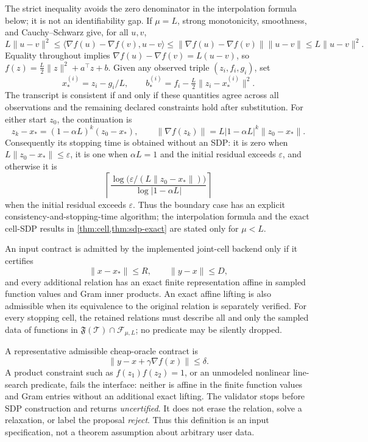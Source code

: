 \documentclass[smallextended]{svjour3}
\newcommand{\cF}{\mathcal{F}}
\newcommand{\cT}{\mathcal{T}}
\newcommand{\ip}[2]{\langle #1,#2\rangle}
\newcommand{\norm}[1]{\lVert #1\rVert}
\newcommand{\eps}{\varepsilon}
\begin{document}
\begin{remark}[$\mu=L$ boundary]
\label{rem:equal-curvature}
The strict inequality avoids the zero denominator in the interpolation formula
below; it is not an identifiability gap.  If $\mu=L$, strong monotonicity,
smoothness, and Cauchy--Schwarz give, for all $u,v$,
\[
 L\norm{u-v}^2
 \leq \ip{\nabla f(u)-\nabla f(v)}{u-v}
 \leq \norm{\nabla f(u)-\nabla f(v)}\norm{u-v}
 \leq L\norm{u-v}^2.
\]
Equality throughout implies $\nabla f(u)-\nabla f(v)=L(u-v)$, so
$f(z)=\tfrac L2\norm{z}^2+a^\top z+b$.  Given any observed triple
$(z_i,f_i,g_i)$, set
\[
 x_*^{(i)}=z_i-g_i/L,
 \qquad
 b_*^{(i)}=f_i-\tfrac L2\norm{z_i-x_*^{(i)}}^2.
\]
The transcript is consistent if and only if these quantities agree across all
observations and the remaining declared constraints hold after substitution.
For either start $z_0$, the continuation is
\[
 z_k-x_*=(1-\alpha L)^k(z_0-x_*),\qquad
 \norm{\nabla f(z_k)}=L|1-\alpha L|^k\norm{z_0-x_*}.
\]
Consequently its stopping time is obtained without an SDP: it is zero when
$L\norm{z_0-x_*}\leq\eps$, it is one when $\alpha L=1$ and the initial
residual exceeds $\eps$, and otherwise it is
\[
 \left\lceil
 \frac{\log\!\bigl(\eps/(L\norm{z_0-x_*})\bigr)}
      {\log|1-\alpha L|}
 \right\rceil
\]
when the initial residual exceeds $\eps$.  Thus the boundary case has an
explicit consistency-and-stopping-time algorithm; the interpolation formula and the exact
cell-SDP results in \cref{thm:cell,thm:sdp-exact} are stated only for
$\mu<L$.
\end{remark}

\begin{definition}
\label{def:transcript-interface}
An input contract is admitted by the implemented joint-cell backend only if
it certifies
\begin{equation}
 \norm{x-x_*}\leq R,\qquad \norm{y-x}\leq D,
 \label{eq:distance-bounds}
\end{equation}
and every additional relation has an exact finite representation affine in
sampled function values and Gram inner products.  An exact affine lifting is
also admissible when its equivalence to the original relation is separately
verified.  For every stopping cell, the retained relations must describe all
and only the sampled data of functions in
$\mathfrak F(\cT)\cap\cF_{\mu,L}$; no predicate may be silently dropped.
\end{definition}

A representative admissible cheap-oracle contract is
\begin{equation}
 \norm{y-x+\gamma\nabla f(x)}\leq\delta.            \label{eq:cheap-contract}
\end{equation}
A product constraint such as $f(z_1)f(z_2)=1$, or an unmodeled nonlinear
line-search predicate, fails the interface: neither is affine in the finite
function values and Gram entries without an additional exact lifting.  The
validator stops before SDP construction and returns \emph{uncertified}.  It
does not erase the relation, solve a relaxation, or label the proposal
\emph{reject}.  Thus this definition is an input specification, not a theorem
assumption about arbitrary user data.
\end{document}

